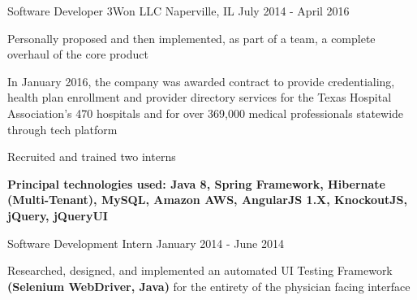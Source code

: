 \begin{cventries}
  \cventry
    {Software Developer} %
    {3Won LLC} %
    {Naperville, IL} %
    {July 2014 - April 2016} %
    {
      \begin{cvitems} %
         \item{Personally proposed and then implemented, as part of a team, a complete overhaul of the core product}
  \item{In January 2016, the company was awarded contract to provide credentialing, health plan enrollment and provider directory services for the Texas Hospital Association’s 470 hospitals and for over 369,000 medical professionals statewide through tech platform}
 \item{Recruited and trained two interns}
 \item{\textbf{Principal technologies used: Java 8, Spring Framework, Hibernate (Multi-Tenant), MySQL, Amazon AWS, AngularJS 1.X, KnockoutJS, jQuery, jQueryUI}}
      \end{cvitems}
    }

  \cventry
    {Software Development Intern} %
    {} %
    {} %
    {January 2014 - June 2014} %
    {
      \begin{cvitems} %
         \item{Researched, designed, and implemented an automated UI Testing Framework \textbf{(Selenium WebDriver, Java)} for the entirety of the physician facing interface}
      \end{cvitems}
    }

\end{cventries}
